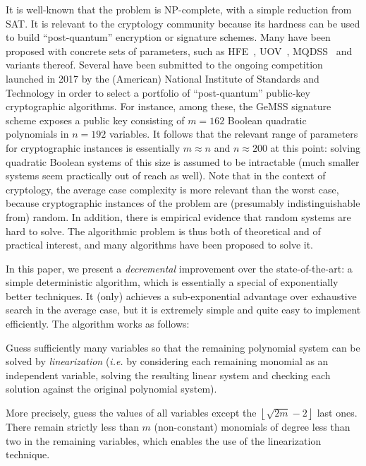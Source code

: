 \documentclass[a4paper,UKenglish,cleveref, autoref]{lipics-v2019}
\begin{document}
It is well-known that the problem is NP-complete, with a simple reduction from
SAT. It is relevant to the cryptology community because its hardness can be used
to build ``post-quantum'' encryption or signature schemes. Many have been
proposed with concrete sets of parameters, such as HFE~\cite{Patarin96},
UOV~\cite{KipnisPG99}, MQDSS~\cite{ChenHRSS16} and variants thereof. Several
have been submitted to the ongoing competition launched in 2017 by the
(American) National Institute of Standards and Technology in order to select a
portfolio of ``post-quantum'' public-key cryptographic algorithms. For instance,
among these, the \textsf{GeMSS} signature scheme exposes a public key consisting
of $m=162$ Boolean quadratic polynomials in $n=192$ variables. It follows that
the relevant range of parameters for cryptographic instances is essentially
$m \approx n$ and $n \approx 200$ at this point: solving quadratic Boolean
systems of this size is assumed to be intractable (much smaller systems seem
practically out of reach as well). Note that in the context of cryptology, the
average case complexity is more relevant than the worst case, because
cryptographic instances of the problem are (presumably indistinguishable from)
random. In addition, there is empirical evidence that random systems are hard to
solve. The algorithmic problem is thus both of theoretical and of practical
interest, and many algorithms have been proposed to solve it.

In this paper, we present a \emph{decremental} improvement over the
state-of-the-art: a simple deterministic algorithm, which is essentially a
special of exponentially better techniques. It (only) achieves a sub-exponential
advantage over exhaustive search in the average case, but it is extremely simple
and quite easy to implement efficiently. The algorithm works as follows:

\begin{framed}
  Guess sufficiently many variables so that the remaining polynomial system can
  be solved by \emph{linearization} (\textit{i.e.} by considering each remaining
  monomial as an independent variable, solving the resulting linear system and
  checking each solution against the original polynomial system).
\end{framed}

More precisely, guess the values of all variables except the
$\left\lfloor \sqrt{2m} - 2 \right\rfloor$ last ones. There remain strictly
less than $m$ (non-constant) monomials of degree less than two in the remaining
variables, which enables the use of the linearization technique.
\end{document}
